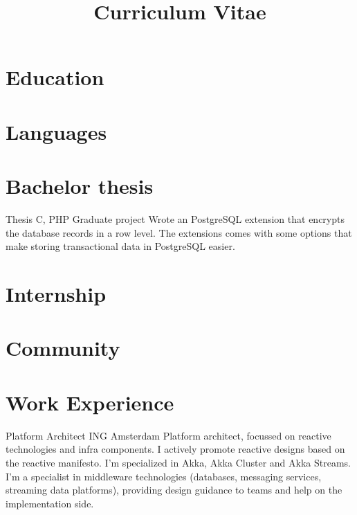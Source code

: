 \documentclass[11pt,a4paper]{moderncv}
\title{Curriculum Vitae}
\begin{document}
\maketitle

\section{Education}

\section{Languages}

\section{Bachelor thesis}
{Thesis}
{C, PHP}
{Graduate project}{}
{
Wrote an PostgreSQL extension that encrypts the database records in a row
level. The extensions comes with some options that make storing transactional
data in PostgreSQL easier.
}

\section{Internship}

\section{Community}

\section{Work Experience}

\vspace*{0.2\baselineskip}
{Platform Architect}
{ING}
{Amsterdam}
{}
{
  Platform architect, focussed on reactive technologies
  and infra components.
  I actively promote reactive designs based on the reactive
  manifesto. I'm specialized in Akka, Akka Cluster and Akka Streams.
  I'm a specialist in middleware technologies (databases, messaging
  services, streaming data platforms), providing design guidance to
  teams and help on the implementation side.
}
\end{document}
